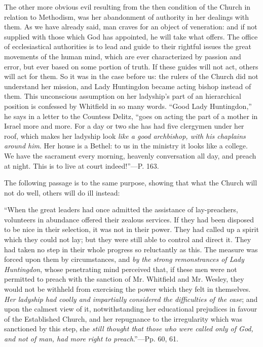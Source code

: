 The other more obvious evil resulting from the
then condition of the Church in relation to Methodism, was her
abandonment of authority in her dealings with them. As we have already
said, man craves for an object of veneration: and if not supplied with
those which God has appointed, he will take what offers. The office of
ecclesiastical authorities is to lead and guide to their rightful
issues the great movements of the human mind, which are ever
characterized by passion and error, but ever based on some portion of
truth. If these guides will not act, others will act for them. So it
was in the case before us: the rulers of the Church did not understand
her mission, and Lady Huntingdon became acting bishop instead of them.
This unconscious assumption on her ladyship's part of an hierarchical
position is confessed by Whitfield in so many words. ``Good Lady
Huntingdon,'' he says in a letter to the Countess Delitz, ``goes
on acting the part of a mother in Israel more and more. For a day or
two she has had five clergymen under her roof, which makes her
ladyship look \emph{like a good archbishop, with his chaplains around him}.
Her house is a Bethel: to us in the ministry it looks like a college.
We have the sacrament every morning, heavenly conversation all day,
and preach at night. This is to live at court indeed!''—P. 163.

The following passage is to the same purpose,
showing that what the Church will not do well, others will do ill
instead:

``When
the great leaders had once admitted the assistance of lay-preachers,
volunteers in abundance offered their zealous services. If they had
been disposed to be nice in their selection, it was not in their
power. They had called up a spirit which they could not lay; but they
were still able to control and direct it. They had taken no step in
their whole progress so reluctantly as this. The measure was forced
upon them by circumstances, and \emph{by the strong remonstrances of Lady
Huntingdon}, whose penetrating mind perceived that, if these men
were not permitted to preach with the sanction of Mr. Whitfield and
Mr. Wesley, they would not be withheld from exercising the power which
they felt in themselves. \emph{Her ladyship had coolly and impartially
considered the difficulties of the case}; and upon the calmest view
of it, notwithstanding her educational prejudices in favour of the
Established Church, and her repugnance to the irregularity which was
sanctioned by this step, she \emph{still thought that those who were
called only of God, and not of man, had more right to preach}.''—Pp.
60, 61.

